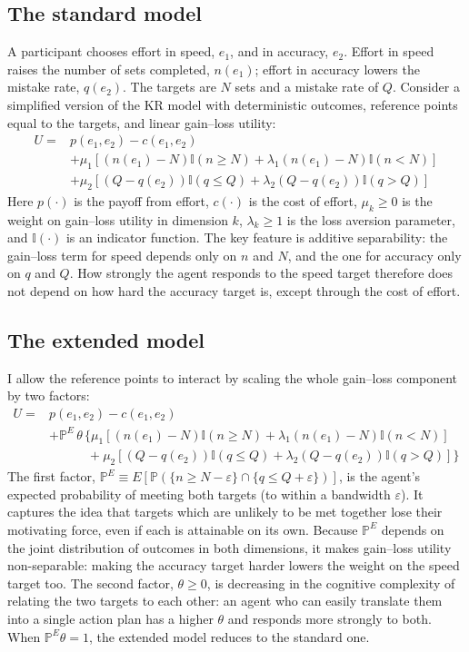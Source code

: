 \documentclass[12pt, letterpaper]{article}
\begin{document}
\subsection{The standard model}

A participant chooses effort in speed, $e_1$, and in accuracy, $e_2$. Effort in speed raises the number of sets completed, $n(e_1)$; effort in accuracy lowers the mistake rate, $q(e_2)$. The targets are $N$ sets and a mistake rate of $Q$. Consider a simplified version of the KR model with deterministic outcomes, reference points equal to the targets, and linear gain--loss utility:
\[
\begin{aligned}
U = {} & p(e_1, e_2) - c(e_1, e_2) \\
& + \mu_1[(n(e_1)-N)\mathbb{I}(n \geq N) + \lambda_1(n(e_1)-N)\mathbb{I}(n<N)] \\
& + \mu_2[(Q-q(e_2))\mathbb{I}(q \leq Q) + \lambda_2(Q-q(e_2))\mathbb{I}(q>Q)]
\end{aligned}
\]
Here $p(\cdot)$ is the payoff from effort, $c(\cdot)$ is the cost of effort, $\mu_k \geq 0$ is the weight on gain--loss utility in dimension $k$, $\lambda_k \geq 1$ is the loss aversion parameter, and $\mathbb{I}(\cdot)$ is an indicator function. The key feature is additive separability: the gain--loss term for speed depends only on $n$ and $N$, and the one for accuracy only on $q$ and $Q$. How strongly the agent responds to the speed target therefore does not depend on how hard the accuracy target is, except through the cost of effort.

\subsection{The extended model}

I allow the reference points to interact by scaling the whole gain--loss component by two factors:
\[
\begin{aligned}
U = {} & p(e_1, e_2) - c(e_1, e_2) \\
& + \mathbb{P}^E \, \theta \, \bigl\{ \mu_1[(n(e_1)-N)\mathbb{I}(n \geq N) + \lambda_1(n(e_1)-N)\mathbb{I}(n<N)] \\
& \qquad\quad + \mu_2[(Q-q(e_2))\mathbb{I}(q \leq Q) + \lambda_2(Q-q(e_2))\mathbb{I}(q>Q)] \bigr\}
\end{aligned}
\]
The first factor, $\mathbb{P}^E \equiv E[\mathbb{P}(\{n \geq N - \varepsilon \} \cap \{q \leq Q + \varepsilon\})]$, is the agent's expected probability of meeting both targets (to within a bandwidth $\varepsilon$). It captures the idea that targets which are unlikely to be met together lose their motivating force, even if each is attainable on its own. Because $\mathbb{P}^E$ depends on the joint distribution of outcomes in both dimensions, it makes gain--loss utility non-separable: making the accuracy target harder lowers the weight on the speed target too. The second factor, $\theta \geq 0$, is decreasing in the cognitive complexity of relating the two targets to each other: an agent who can easily translate them into a single action plan has a higher $\theta$ and responds more strongly to both. When $\mathbb{P}^E \theta = 1$, the extended model reduces to the standard one.
\end{document}
